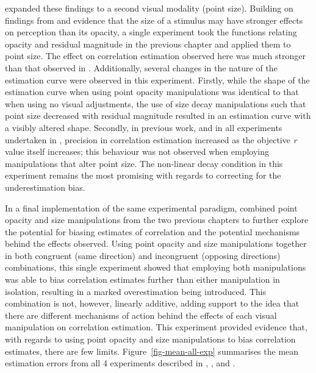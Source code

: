 \documentclass[../main.tex]{subfiles}
\begin{document}
 expanded these findings to a second visual
modality (point size). Building on findings from
 and evidence that the size of a stimulus
may have stronger effects on perception than its opacity, a single
experiment took the functions relating opacity and residual magnitude in
the previous chapter and applied them to point size. The effect on
correlation estimation observed here was much stronger than that
observed in . Additionally, several changes
in the nature of the estimation curve were observed in this experiment.
Firstly, while the shape of the estimation curve when using point
opacity manipulations was identical to that when using no visual
adjustments, the use of size decay manipulations such that point size
decreased with residual magnitude resulted in an estimation curve with a
visibly altered shape. Secondly, in previous work, and in all
experiments undertaken in , precision in
correlation estimation increased as the objective \emph{r} value itself
increases; this behaviour was not observed when employing manipulations
that alter point size. The non-linear decay condition in this experiment
remains the most promising with regards to correcting for the
underestimation bias.

In a final implementation of the same experimental paradigm,
 combined point opacity and size
manipulations from the two previous chapters to further explore the
potential for biasing estimates of correlation and the potential
mechanisms behind the effects observed. Using point opacity and size
manipulations together in both congruent (same direction) and
incongruent (opposing directions) combinations, this single experiment
showed that employing both manipulations was able to bias correlation
estimates further than either manipulation in isolation, resulting in a
marked overestimation being introduced. This combination is not,
however, linearly additive, adding support to the idea that there are
different mechanisms of action behind the effects of each visual
manipulation on correlation estimation. This experiment provided
evidence that, with regards to using point opacity and size
manipulations to bias correlation estimates, there are few limits.
Figure~\ref{fig-mean-all-exp} summarises the mean estimation errors from
all 4 experiments described in ,
, and .
\end{document}
